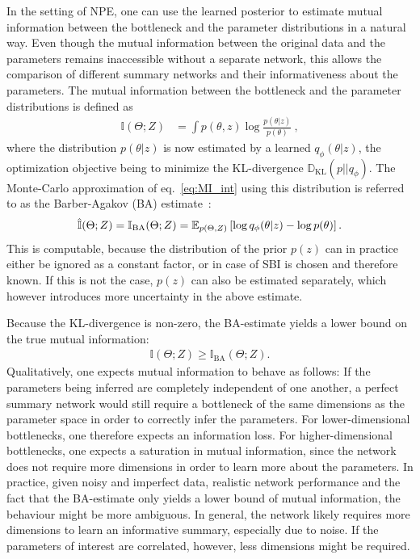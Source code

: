 In the setting of NPE, one can use the learned posterior to estimate mutual information between the bottleneck and the parameter distributions in a natural way. Even though the mutual information between the original data and the parameters remains inaccessible without a separate network, this allows the comparison of different summary networks and their informativeness about the parameters. The mutual information between the bottleneck and the parameter distributions is defined as
\begin{align}
    \mathbb{I}(\Theta; Z) &= \int p(\theta, z) \log \frac{p(\theta|z)}{p(\theta)}~\label{eq:MI_int},
\end{align}
where the distribution $p(\theta|z)$ is now estimated by a learned $q_\phi(\theta|z)$, the optimization objective being to minimize the KL-divergence $\mathbb{D}_{\text{KL}}(p||q_\phi)$. The Monte-Carlo approximation of eq.~\ref{eq:MI_int} using this distribution is referred to as the Barber-Agakov (BA) estimate~\cite{Barber_2003}:
\begin{align}
    \hat{\mathbb{I}}(\Theta;Z) = \mathbb{I}_{\text{BA}}(\Theta;Z) = \mathbb{E}_{p(\Theta,Z)} \left[ \log q_\phi(\theta|z) - \log p(\theta) \right].
\end{align}
This is computable, because the distribution of the prior $p(z)$ can in practice either be ignored as a constant factor, or in case of SBI is chosen and therefore known. If this is not the case, $p(z)$ can also be estimated separately, which however introduces more uncertainty in the above estimate.

Because the KL-divergence is non-zero, the BA-estimate yields a lower bound on the true mutual information:
\begin{align}
    \mathbb{I}(\Theta;Z) \geq \mathbb{I}_{\text{BA}}(\Theta;Z).
\end{align}
Qualitatively, one expects mutual information to behave as follows: If the parameters being inferred are completely independent of one another, a perfect summary network would still require a bottleneck of the same dimensions as the parameter space in order to correctly infer the parameters. For lower-dimensional bottlenecks, one therefore expects an information loss. For higher-dimensional bottlenecks, one expects a saturation in mutual information, since the network does not require more dimensions in order to learn more about the parameters. In practice, given noisy and imperfect data, realistic network performance and the fact that the BA-estimate only yields a lower bound of mutual information, the behaviour might be more ambiguous. In general, the network likely requires more dimensions to learn an informative summary, especially due to noise. If the parameters of interest are correlated, however, less dimensions might be required.


